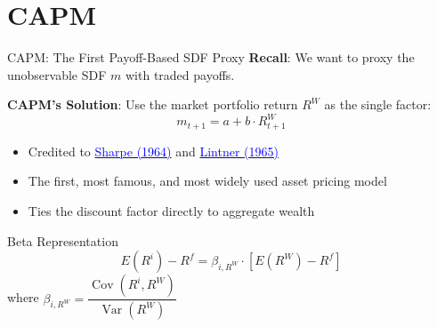 \documentclass{beamer}
\begin{document}


\section{CAPM}

\begin{frame}{CAPM: The First Payoff-Based SDF Proxy}
	\textbf{Recall}: We want to proxy the unobservable SDF $m$ with traded payoffs.
	
	\vspace{8pt}
	\textbf{CAPM's Solution}: Use the \alert{market portfolio return} $R^W$ as the single factor:
	\begin{equation*}
		m_{t+1} = a + b \cdot R^W_{t+1}
	\end{equation*}
	
	\vspace{5pt}
	\begin{itemize}
		\item Credited to \href{https://doi.org/10.1111/j.1540-6261.1964.tb02865.x}{\textcolor{blue}{Sharpe (1964)}} and \href{https://doi.org/10.1111/j.1540-6261.1965.tb02930.x}{\textcolor{blue}{Lintner (1965)}}
		\item The first, most famous, and most widely used asset pricing model
		\item Ties the discount factor directly to aggregate wealth
	\end{itemize}
	
	\vspace{8pt}
	\begin{block}{Beta Representation}
		\vspace{-5pt}
		\begin{equation*}
			E(R^i) - R^f = \beta_{i,R^W} \cdot [E(R^W) - R^f]
		\end{equation*}
		where $\beta_{i,R^W} = \dfrac{\operatorname{Cov}(R^i, R^W)}{\operatorname{Var}(R^W)}$
	\end{block}
\end{frame}
\end{document}
